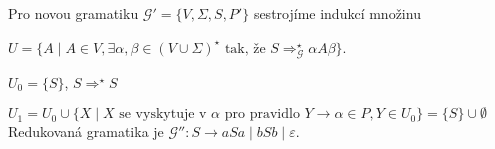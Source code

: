 \documentclass[11pt]{article}
\begin{document}
Pro novou gramatiku $\mathcal{G}' = \{V, \Sigma, S, P'\}$ sestrojíme indukcí množinu

$U = \{A \mid A \in V, \exists \alpha, \beta \in (V \cup \Sigma)^\star \text{ tak, že } S \Rightarrow_\mathcal{G} ^\star \alpha A \beta\}$.

$U_0 = \{S\}$, $S \Rightarrow ^\star S$

$U_1 = U_0 \cup \{X \mid X \text{ se vyskytuje v } \alpha \text{ pro pravidlo } Y \rightarrow \alpha \in P, Y \in U_0\} = \{S\} \cup \emptyset$\\

Redukovaná gramatika je $\mathcal{G}'':  S \rightarrow aSa \mid bSb \mid \varepsilon$.

 
\end{document}
